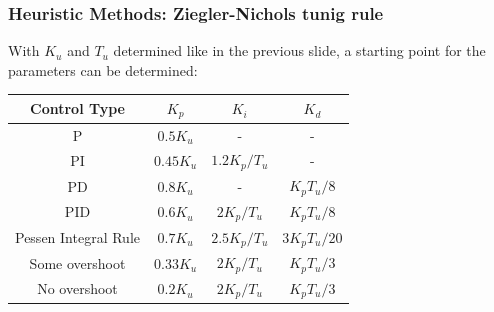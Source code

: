 \begin{frame}
	\frametitle{Heuristic Methods: Ziegler-Nichols tunig rule}
	With $K_u$ and $T_u$ determined like in the previous slide, a starting point for the parameters can be determined:
	\vspace{1em}
	
	\begin{tabular}{c | c | c | c}
		Control Type	&	$K_p$		&	$K_i$			&	$K_d$ 	\\
		\hline
		P				&	$0.5K_u$	&	-				&	-		\\
		PI				&	$0.45K_u$	&	$1.2K_p/T_u$		&	-		\\
		PD				&	$0.8K_u$	&	-				&	$K_pT_u/8$ \\
		PID				&	$0.6K_u$	&	$2K_p/T_u$		&	$K_pT_u/8$ \\
		Pessen Integral Rule & $0.7K_u$ &	$2.5K_p/T_u$	&	$3K_pT_u/20$\\
		Some overshoot	&	$0.33K_u$	&	$2K_p/T_u$		&	$K_pT_u/3$	\\
		No overshoot	&	$0.2K_u$	&	$2K_p/T_u$		&	$K_pT_u/3$	\\
	\end{tabular}
\end{frame}
